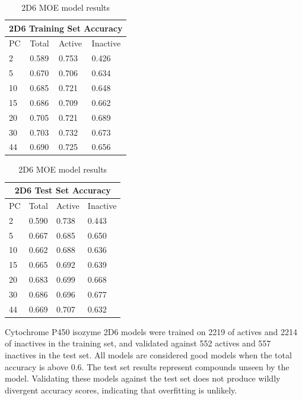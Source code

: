 \begin{table}[!htbp]
\begin{minipage}{.5\linewidth}
\centering
\begin{tabular}{|l|l|l|l|}
\hline
\multicolumn{4}{|c|}{2D6 Training Set Accuracy} \\ \hline
PC & Total          & Active          & Inactive\\ \hline
2  & 0.589          & 0.753           & 0.426   \\ \hline
5  & 0.670          & 0.706           & 0.634   \\ \hline
10 & 0.685          & 0.721           & 0.648   \\ \hline
15 & 0.686          & 0.709           & 0.662   \\ \hline
20 & 0.705          & 0.721           & 0.689   \\ \hline
30 & 0.703          & 0.732           & 0.673   \\ \hline
44 & 0.690          & 0.725           & 0.656   \\ \hline
\end{tabular}
\end{minipage}
\begin{minipage}{.5\linewidth}
\centering
\begin{tabular}{|l|l|l|l|}
\hline
\multicolumn{4}{|c|}{2D6 Test Set Accuracy}      \\ \hline
PC & Total          & Active          & Inactive \\ \hline
2  & 0.590          & 0.738           & 0.443    \\ \hline
5  & 0.667          & 0.685           & 0.650    \\ \hline
10 & 0.662          & 0.688           & 0.636    \\ \hline
15 & 0.665          & 0.692           & 0.639    \\ \hline
20 & 0.683          & 0.699           & 0.668    \\ \hline
30 & 0.686          & 0.696           & 0.677    \\ \hline
44 & 0.669          & 0.707           & 0.632    \\ \hline
\end{tabular}
\end{minipage}
\caption{2D6 MOE model results}
\end{table}

Cytochrome P450 isozyme 2D6 models were trained on 2219 of actives and 2214 of inactives in the training set, and validated against 552 actives and 557 inactives in the test set. All models are considered good models when the total accuracy is above 0.6. The test set results represent compounds unseen by the model. Validating these models against the test set does not produce wildly divergent accuracy scores, indicating that overfitting is unlikely.

